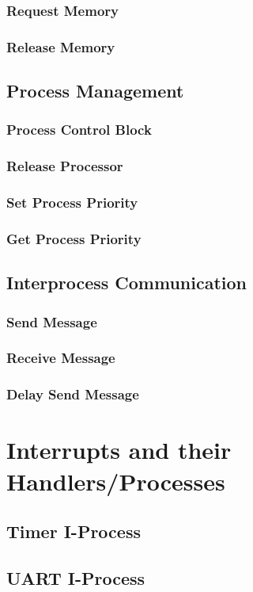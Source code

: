 \documentclass[12pt]{article}
\begin{document}
\subsubsection{Request Memory}
\subsubsection{Release Memory}
\subsection{Process Management}
\subsubsection{Process Control Block}
\subsubsection{Release Processor}
\subsubsection{Set Process Priority}
\subsubsection{Get Process Priority}
\subsection{Interprocess Communication}
\subsubsection{Send Message}
\subsubsection{Receive Message}
\subsubsection{Delay Send Message}
\newpage
\section{Interrupts and their Handlers/Processes}
\subsection{Timer I-Process}
\subsection{UART I-Process}
\end{document}
